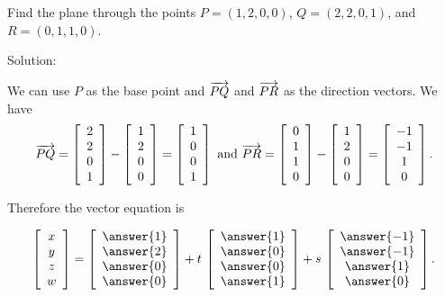 \documentclass{ximera}
\begin{document}
\begin{example}\label{ex:plane-from-three-points}
  Find the plane through the
  points $P = (1,2,0,0)$, $Q = (2,2,0,1)$, and $R = (0,1,1,0)$.

  Solution:

  We can use $P$ as the base point and $\longvect{PQ}$ and
  $\longvect{PR}$ as the direction vectors. We have
  \begin{equation*}
    \longvect{PQ} =
    \startmat{c} 2\\2\\0\\1 \stopmat
    - \startmat{c} 1\\2\\0\\0 \stopmat
    = \startmat{c} 1\\0\\0\\1 \stopmat
    \quad\mbox{and}\quad
    \longvect{PR} =
    \startmat{c} 0\\1\\1\\0 \stopmat
    - \startmat{c} 1\\2\\0\\0 \stopmat
    = \startmat{c} -1\\-1\\1\\0 \stopmat.
  \end{equation*}

  Therefore the vector equation is

  \begin{equation*}
    \startmat{c} x\\y\\z\\w \stopmat
    = \startmat{c} \answer{1}\\\answer{2}\\\answer{0}\\\answer{0} \stopmat
    + t\,\startmat{c} \answer{1}\\\answer{0}\\\answer{0}\\\answer{1} \stopmat
    + s\,\startmat{c} \answer{-1}\\\answer{-1}\\\answer{1}\\\answer{0} \stopmat.
\end{equation*}
\end{example}
\end{document}
